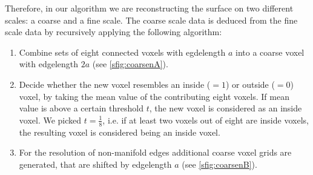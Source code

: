Therefore, in our algorithm we are reconstructing the surface on two different scales: a coarse and a fine scale. The coarse scale data is deduced from the fine scale data by recursively applying the following algorithm:
\begin{enumerate}
\item Combine sets of eight connected voxels with egdelength $a$ into a coarse voxel with edgelength $2a$ (see \autoref{sfig:coarsenA}).
\item Decide whether the new voxel resembles an inside ($=1$) or outside ($=0$) voxel, by taking the mean value of the contributing eight voxels. If mean value is above a certain threshold $t$, the new voxel is considered as an inside voxel. We picked $t=\frac{1}{8}$, i.e. if at least two voxels out of eight are inside voxels, the resulting voxel is considered being an inside voxel.
\item For the resolution of non-manifold edges additional coarse voxel grids are generated, that are shifted by edgelength $a$ (see \autoref{sfig:coarsenB}).
\end{enumerate}
